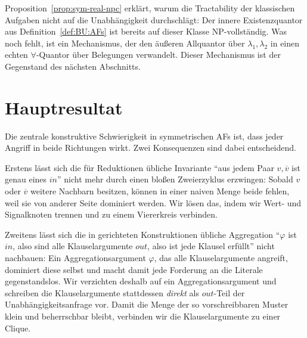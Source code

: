Proposition~\ref{prop:sym-real-npc} erklärt, warum die Tractability der
klassischen Aufgaben nicht auf die Unabhängigkeit durchschlägt: Der innere
Existenzquantor aus Definition~\ref{def:BU:AFs} ist bereits auf dieser Klasse
NP-vollständig. Was noch fehlt, ist ein Mechanismus, der den äußeren
Allquantor über \(\lambda_1,\lambda_2\) in einen echten \(\forall\)-Quantor
über Belegungen verwandelt. Dieser Mechanismus ist der Gegenstand des nächsten
Abschnitts.

\section{Hauptresultat}
\label{sec:sym-hauptresultat}

Die zentrale konstruktive Schwierigkeit in symmetrischen AFs ist, dass jeder
Angriff in beide Richtungen wirkt. Zwei Konsequenzen sind dabei entscheidend.

Erstens lässt sich die für Reduktionen übliche Invariante \enquote{aus jedem
Paar \(v,\overline{v}\) ist genau eines \(\mathit{in}\)} nicht mehr durch einen
bloßen Zweierzyklus erzwingen: Sobald \(v\) oder \(\overline{v}\) weitere
Nachbarn besitzen, können in einer naiven Menge beide fehlen, weil sie von
anderer Seite dominiert werden. Wir lösen das, indem wir Wert- und Signalknoten
trennen und zu einem Viererkreis verbinden.

Zweitens lässt sich die in gerichteten Konstruktionen übliche Aggregation
\enquote{\(\varphi\) ist \(\mathit{in}\), also sind alle Klauselargumente
\(\mathit{out}\), also ist jede Klausel erfüllt} nicht nachbauen: Ein
Aggregationsargument \(\varphi\), das alle Klauselargumente angreift,
dominiert diese selbst und macht damit jede Forderung an die Literale
gegenstandslos. Wir verzichten deshalb auf ein Aggregationsargument und
schreiben die Klauselargumente stattdessen \emph{direkt} als
\(\mathit{out}\)-Teil der Unabhängigkeitsanfrage vor. Damit die Menge der so
vorschreibbaren Muster klein und beherrschbar bleibt, verbinden wir die
Klauselargumente zu einer Clique.

